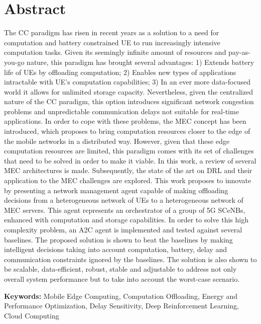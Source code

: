 \section*{Abstract}


\noindent The \acrfull{CC} paradigm has risen in recent years as a solution to a need for computation and battery constrained \acrfull{UE} to run increasingly intensive computation tasks. Given its seemingly infinite amount of resources and pay-as-you-go nature, this paradigm has brought several advantages: 1) Extends battery life of \acrshort{UE}s by offloading computation; 2) Enables new types of applications intractable with \acrshort{UE}'s computation capabilities; 3) In an ever more data-focused world it allows for unlimited storage capacity. Nevertheless, given the centralized nature of the \acrshort{CC} paradigm, this option introduces significant network congestion problems and unpredictable communication delays not suitable for real-time applications. In order to cope with these problems, the \acrfull{MEC} concept has been introduced, which proposes to bring computation resources closer to the edge of the mobile networks in a distributed way. However, given that these edge computation resources are limited, this paradigm comes with its set of challenges that need to be solved in order to make it viable. In this work, a review of several \acrshort{MEC} architectures is made. Subsequently, the state of the art on \acrfull{DRL} and their application to the \acrshort{MEC} challenges are explored. This work proposes to innovate by presenting a network management agent capable of making offloading decisions from a heterogeneous network of \acrshort{UE}s to a heterogeneous network of \acrshort{MEC} servers. This agent represents an orchestrator of a group of 5G \acrfull{SCeNBs}, enhanced with computation and storage capabilities. In order to solve this high complexity problem, an \acrfull{A2C} agent is implemented and tested against several baselines. The proposed solution is shown to beat the baselines by making intelligent decisions taking into
account computation, battery, delay and communication constraints ignored by the baselines. The solution is also shown to be scalable, data-efficient, robust, stable and adjustable to address not only overall system performance but to take into account the worst-case scenario.

\vfill

\textbf{\Large Keywords:} Mobile Edge Computing, Computation Offloading, Energy and Performance Optimization, Delay Sensitivity, Deep Reinforcement Learning, Cloud Computing

